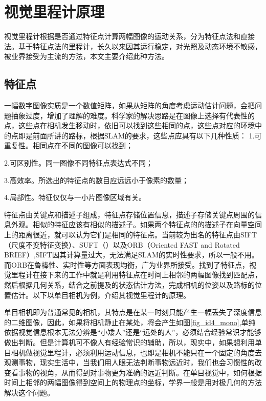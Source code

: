 \documentclass[10.5pt,twocolumn]{jbuaa}
\begin{document}
 
\section{视觉里程计原理}
视觉里程计根据是否通过特征点计算两幅图像的运动关系，分为特征点法和直接法。基于特征点法的里程计，长久以来因其运行稳定，对光照及动态环境不敏感，被业界接受为主流的方法，本文主要介绍此种方法。
\subsection{特征点}
一幅数字图像实质是一个数值矩阵，如果从矩阵的角度考虑运动估计问题，会把问题抽象过度，增加了理解的难度。科学家的解决思路是在图像上选择有代表性的点，这些点在相机发生移动时，依旧可以找到这些相同的点，这些点对应的环境中的点即是前面所讲的路标，根据SLAM的要求，这些点应具有以下几种性质：
1.可重复性。相同点在不同的图像可以找到；

2.可区别性。同一图像不同特征点表达式不同；

3.高效率。所选出的特征点的数目应远远小于像素的数量；

4.局部性。特征仅仅与一小片图像区域有关。

特征点由关键点和描述子组成，特征点存储位置信息，描述子存储关键点周围的信息外观。相似的特征应该有相似的描述子。如果两个特征点的的描述子在向量空间上的距离很近，就可以认为它们是相同的特征点。当前较为出名的特征点由SIFT（尺度不变特征变换）、SUFT（）以及ORB（Oriented FAST and Rotated BRIEF）,SIFT因其计算量过大，无法满足SLAM的实时性要求，所以一般不用。而ORB在鲁棒性、实时性等方面表现均衡，广为业界所接受。找到了特征点，视觉里程计在接下来的工作中就是利用特征点在时间上相邻的两幅图像找到匹配点，然后根据几何关系，结合之前提及的状态估计方法，完成相机的位姿以及路标的位置估计。以下以单目相机为例，介绍其视觉里程计的原理。

单目相机即为普通常见的相机，其特点是在某一时刻只能产生一幅丢失了深度信息的二维图像，因此，如果将相机静止在某处，将会产生如图\ref{fig_id4_mono},单纯依据视觉信息根本无法分辨是“小矮人”还是“远处的人”，必须结合经验常识才能够做出判断。但是计算机可不像人有经验常识的辅助，所以，现实中，如果想利用单目相机做视觉里程计，必须利用运动信息，也即是相机不能只在一个固定的角度去观测事物，现实生活中，当我们用人眼无法判断事物远近时，我们也会习惯性的改变看事物的视角，从而得到对事物更为准确的远近判断。在单目视觉中，如何根据时间上相邻的两幅图像得到空间上的物理点的坐标，学界一般是用对极几何的方法解决这个问题。
\end{document}
